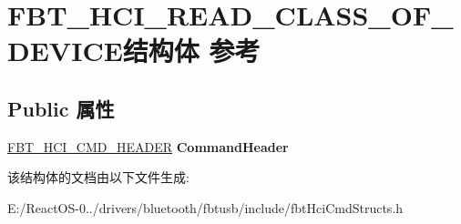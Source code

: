 \hypertarget{struct_f_b_t___h_c_i___r_e_a_d___c_l_a_s_s___o_f___d_e_v_i_c_e}{}\section{F\+B\+T\+\_\+\+H\+C\+I\+\_\+\+R\+E\+A\+D\+\_\+\+C\+L\+A\+S\+S\+\_\+\+O\+F\+\_\+\+D\+E\+V\+I\+C\+E结构体 参考}
\label{struct_f_b_t___h_c_i___r_e_a_d___c_l_a_s_s___o_f___d_e_v_i_c_e}
\subsection*{Public 属性}
\begin{DoxyCompactItemize}
\item 
\mbox{\label{struct_f_b_t___h_c_i___r_e_a_d___c_l_a_s_s___o_f___d_e_v_i_c_e_a72edd32999a4815c668adafae87bb062}} 
\hyperlink{struct_f_b_t___h_c_i___c_m_d___h_e_a_d_e_r}{F\+B\+T\+\_\+\+H\+C\+I\+\_\+\+C\+M\+D\+\_\+\+H\+E\+A\+D\+ER} {\bfseries Command\+Header}
\end{DoxyCompactItemize}


该结构体的文档由以下文件生成\+:\begin{DoxyCompactItemize}
\item 
E\+:/\+React\+O\+S-\/0../drivers/bluetooth/fbtusb/include/fbt\+Hci\+Cmd\+Structs.\+h\end{DoxyCompactItemize}
